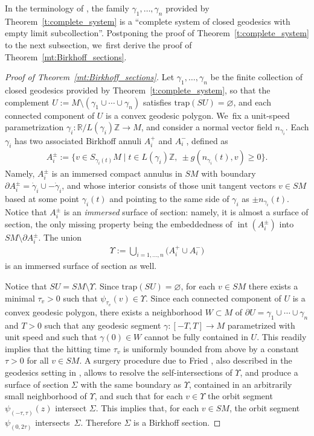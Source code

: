 \documentclass[11pt]{article}
\let\sep\mid
\newcommand{\Z}{\mathbb{Z}}
\newcommand{\R}{\mathbb{R}}
\newcommand{\trap}{\mathrm{trap}}
\DeclareMathOperator{\interior}{int}
\theoremstyle{plain}
\theoremstyle{definition}
\begin{document}
In the terminology of \cite[\S 4.2]{Contreras:2022ab}, the family $\gamma_1,\dots,\gamma_n$ provided by Theorem~\ref{t:complete_system} is a ``complete system of closed geodesics with empty limit subcollection''. Postponing the proof of Theorem~\ref{t:complete_system} to the next subsection, we~first derive the proof of Theorem~\ref{mt:Birkhoff_sections}.

\begin{proof}[Proof of Theorem~\ref{mt:Birkhoff_sections}]
Let $\gamma_1,\dots,\gamma_n$ be the finite collection of closed geodesics provided by Theorem~\ref{t:complete_system}, so that the complement $U:=M\setminus(\gamma_1\cup\cdots\cup\gamma_n)$ satisfies $\trap(SU)=\varnothing$, and each connected component of $U$ is a convex geodesic polygon. We~fix a unit-speed parametrization $\gamma_i:\R/L(\gamma_i)\Z\to M$, and consider a normal vector field $n_{\gamma_i}$. Each $\gamma_i$ has two associated Birkhoff annuli $A_i^+$ and $A_i^-$, defined as
\begin{align*}
A_i^\pm:=\big\{ v\in S_{\gamma_i(t)}M\sep t\in L(\gamma_i)\Z,\ \pm g(n_{\gamma_i}(t),v)\geq0\big\}.
\end{align*}
Namely, $A_i^\pm$ is an immersed compact annulus in $SM$ with boundary $\partial A_i^\pm=\dot\gamma_i\cup-\dot\gamma_i$, and whose interior consists of those unit tangent vectors $v\in SM$ based at some point $\gamma_i(t)$ and pointing to the same side of $\gamma_i$ as $\pm n_{\gamma_i}(t)$. Notice that $A_i^\pm$ is an \emph{immersed} surface of section: namely, it is almost a surface of section, the only missing property being the embeddedness of $\interior(A_i^\pm)$ into $SM\setminus\partial A_i^\pm$. The union
\begin{align*}
\Upsilon:=\bigcup_{i=1,\dots,n} \big(A_i^+ \cup A_i^-\big)
\end{align*}
is an immersed surface of section as well.

Notice that $SU=SM\setminus\Upsilon$. Since $\trap(SU)=\varnothing$, for each $v\in SM$ there exists a minimal $\tau_v>0$ such that $\psi_{\tau_v}(v)\in\Upsilon$. Since each connected component of $U$ is a convex geodesic polygon, there exists a neighborhood $W\subset M$ of $\partial U=\gamma_1\cup\cdots\cup\gamma_n$ and $T>0$ such that any geodesic segment $\gamma:[-T,T]\to M$ parametrized with unit speed and such that $\gamma(0)\in W$ cannot be fully contained in $U$. This readily implies that the hitting time $\tau_v$ is uniformly bounded from above by a constant $\tau>0$ for all $v\in SM$. A surgery procedure due to Fried \cite{Fried:1983aa}, also described in the geodesics setting in \cite[\S 4.1]{Contreras:2022ab}, allows to resolve the self-intersections of $\Upsilon$, and produce a surface of section $\Sigma$ with the same boundary as $\Upsilon$, contained in an arbitrarily small neighborhood of $\Upsilon$, and such that for each $v\in\Upsilon$ the orbit segment $\psi_{(-\tau,\tau)}(z)$ intersect $\Sigma$. This implies that, for each $v\in SM$, the orbit segment $\psi_{(0,2\tau)}$ intersects~$\Sigma$. Therefore $\Sigma$ is a Birkhoff section.
\end{proof}
\end{document}
